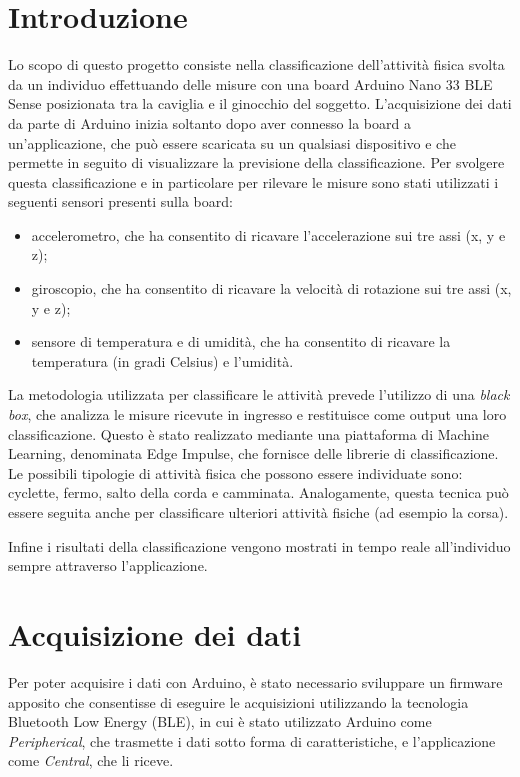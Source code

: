 \section{Introduzione}
Lo scopo di questo progetto consiste nella classificazione dell'attività fisica svolta da un individuo effettuando delle misure con una board Arduino Nano 33 BLE Sense posizionata tra la caviglia e il ginocchio del soggetto. L'acquisizione dei dati da parte di Arduino inizia soltanto dopo aver connesso la board a un'applicazione, che può essere scaricata su un qualsiasi dispositivo e che permette in seguito di visualizzare la previsione della classificazione. Per svolgere questa classificazione e in particolare per rilevare le misure sono stati utilizzati i seguenti sensori presenti sulla board:
\begin{itemize}
	\item accelerometro, che ha consentito di ricavare l'accelerazione sui tre assi (x, y e z);
	\item giroscopio, che ha consentito di ricavare la velocità di rotazione sui tre assi (x, y e z);
	\item sensore di temperatura e di umidità, che ha consentito di ricavare la temperatura (in gradi Celsius) e l'umidità.
\end{itemize}

La metodologia utilizzata per classificare le attività prevede l'utilizzo di una \textit{black box}, che analizza le misure ricevute in ingresso e restituisce come output una loro classificazione. Questo è stato realizzato mediante una piattaforma di Machine Learning, denominata Edge Impulse, che fornisce delle librerie di classificazione. Le possibili tipologie di attività fisica che possono essere individuate sono: cyclette, fermo, salto della corda e camminata. Analogamente, questa tecnica può essere seguita anche per classificare ulteriori attività fisiche (ad esempio la corsa).

Infine i risultati della classificazione vengono mostrati in tempo reale all'individuo sempre attraverso l'applicazione.

\section{Acquisizione dei dati}
Per poter acquisire i dati con Arduino, è stato necessario sviluppare un firmware apposito che consentisse di eseguire le acquisizioni utilizzando la tecnologia Bluetooth Low Energy (BLE), in cui è stato utilizzato Arduino come \textit{Peripherical}, che trasmette i dati sotto forma di caratteristiche, e l'applicazione come \textit{Central}, che li riceve. 

